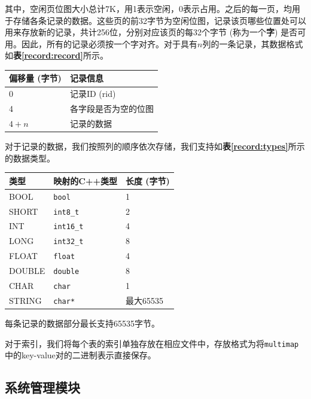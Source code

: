 \documentclass[11pt, a4paper]{article}
\makeatletter
\newcommand\tcaption{\def\@captype{table}\caption}
\newcommand{\tref}[1]{\textbf{表\ref{#1}}}
\makeatother
\begin{document}
其中，空闲页位图大小总计7K，用1表示空闲，0表示占用。之后的每一页，均用于存储各条记录的数据。这些页的前32字节为空闲位图，记录该页哪些位置处可以用来存放新的记录，共计256位，分别对应该页的每32个字节 (称为一个\textbf{字}) 是否可用。因此，所有的记录必须按一个字对齐。对于具有$n$列的一条记录，其数据格式如\tref{record:record}所示。

\begin{center}
    \tcaption{记录数据格式}\label{record:record}
    \begin{tabular}{ll}
        \toprule
        偏移量 (字节) & 记录信息 \\
        \midrule
        0 & 记录ID (rid)  \\
        4 & 各字段是否为空的位图 \\
        $4+n$ & 记录的数据 \\
        \bottomrule
    \end{tabular}
\end{center}

对于记录的数据，我们按照列的顺序依次存储，我们支持如\tref{record:types}所示的数据类型。

\begin{center}
    \tcaption{支持的数据类型}\label{record:types}
    \begin{tabular}{lll}
        \toprule
        类型 & 映射的C++类型 & 长度 (字节) \\
        \midrule
        BOOL & \texttt{bool} & 1 \\
        SHORT & \texttt{int8\_t} & 2 \\
        INT & \texttt{int16\_t} & 4 \\
        LONG & \texttt{int32\_t} & 8 \\
        FLOAT & \texttt{float} & 4 \\
        DOUBLE & \texttt{double} & 8 \\
        CHAR & \texttt{char} & 1 \\
        STRING & \texttt{char*} & 最大65535 \\
        \bottomrule
    \end{tabular}
\end{center}

每条记录的数据部分最长支持65535字节。

对于索引，我们将每个表的索引单独存放在相应文件中，存放格式为将\texttt{multimap}中的key-value对的二进制表示直接保存。

\subsection{系统管理模块}
\end{document}
